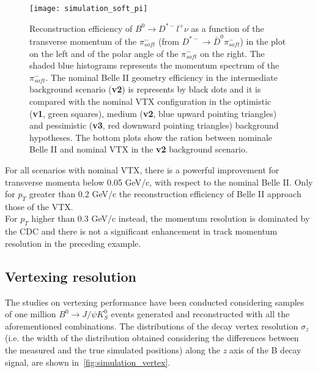 \begin{figure}[h!]
\centering
\texttt{[image: simulation\_soft\_pi]}
\caption{Reconstruction efficiency of $B^{0} \rightarrow D^{*-}l^{+}\nu$ as a function of the transverse momentum of the $\pi_{soft}^{-}$ (from  $D^{*-} \rightarrow \bar{D}^{0} \pi^{-}_{soft}$) in the plot on the left and of the polar angle of the $\pi_{soft}^{-}$ on the right. 
The shaded blue histograms represents the momentum spectrum of the  $\pi_{soft}^{-}$.
The nominal Belle II geometry efficiency in the intermediate background scenario (\textbf{v2}) is represents by black dots and it is compared with the nominal VTX configuration in the optimistic (\textbf{v1}, green squares), medium (\textbf{v2}, blue upward pointing triangles) and pessimistic (\textbf{v3}, red downward
pointing triangles) background hypotheses. The bottom plots show the ration between nominale Belle II and nominal VTX in the \textbf{v2} background scenario.}
\label{fig:simulation_soft_pi}
\end{figure}

For all scenarios with nominal VTX, there is a powerful improvement for transverse momenta below 0.05 GeV/c, with respect to the nominal Belle II. Only for $p_{T}$ greater than 0.2 GeV/c the reconstruction efficiency of Belle II approach those of the VTX.\\

For $p_{T}$ higher than 0.3 GeV/c instead, the momentum resolution is dominated by the CDC and there is not a significant enhancement in track momentum resolution in the preceding example.

\subsection{Vertexing resolution}

The studies on vertexing performance have been conducted considering samples of one million $B^{0} \rightarrow J/\psi K_{S}^{0}$ events generated and reconstructed with all the aforementioned combinations.
The distributions of the decay vertex resolution $\sigma_{z}$ (i.e. the width of the distribution obtained considering the differences between the measured and the true simulated positions) along the \textit{z} axis of the B decay signal, are shown in~\autoref{fig:simulation_vertex}.

